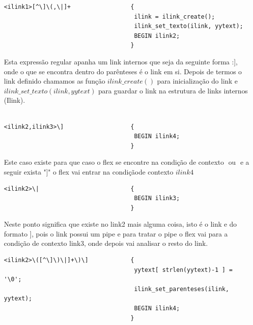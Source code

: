 \documentclass[11pt, a4paper, oneside]{article}
\begin{document}
\begin{verbatim}
<ilink1>[^\]\(,\|]+                 {
                                     ilink = ilink_create();
                                     ilink_set_texto(ilink, yytext);
                                     BEGIN ilink2;
                                    }
\end{verbatim}
Esta expressão regular apanha um link internos que seja da seguinte forma :\begin{math}[[Salts]]\end{math}, onde o que se encontra dentro do parênteses é o link em si. Depois de termos o link definido chamamos as função \begin{math} ilink\_create() \end{math} para inicialização do link e  \begin{math}ilink\_set\_texto(ilink, yytext)\end{math} para guardar o link na estrutura de links internos (Ilink).


\begin{verbatim}

<ilink2,ilink3>\]                   {
                                     BEGIN ilink4;
                                    }
\end{verbatim}
Este caso existe para que caso o flex se encontre na condição de contexto \begin{math}<ilink2>\end{math} ou \begin{math}<ilink3>\end{math} e a seguir exista "]" o flex vai entrar na condiçãode contexto \begin{math}ilink4\end{math}




\begin{verbatim}
<ilink2>\|                          {
                                     BEGIN ilink3;
                                    }
\end{verbatim}


Neste ponto significa que existe no link2 mais alguma coisa, isto é o link e do formato \begin{math}[[Crystallite|grain boundaries]]\end{math}, pois o link possui um pipe e para tratar o pipe o flex vai para a condição de contexto link3, onde depois vai analisar o resto do link. 


\begin{verbatim}
<ilink2>\([^\]\)\|]+\)\]            {
                                     yytext[ strlen(yytext)-1 ] = '\0';
                                     ilink_set_parenteses(ilink, yytext);
                                     BEGIN ilink4;
                                    }

\end{verbatim}
\end{document}
